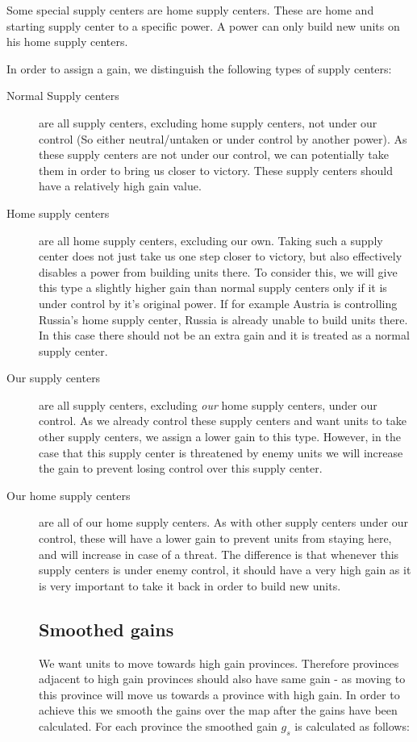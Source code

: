 \documentclass[a4paper]{article} %
\begin{document}
Some special supply centers are home supply centers. These are home and starting supply center to a specific power. A power can only build new units on his home supply centers.   

In order to assign a gain, we distinguish the following types of supply centers: 

\begin{description} 

\item[Normal Supply centers]
are all supply centers, excluding home supply centers, not under our control (So either neutral/untaken or under control by another power). As these supply centers are not under our control, we can potentially take them in order to bring us closer to victory. These supply centers should have a relatively high gain value. 

\item[Home supply centers]
are all home supply centers, excluding our own. Taking such a supply center does not just take us one step closer to victory, but also effectively disables a power from building units there. To consider this, we will give this type a slightly higher gain than normal supply centers only if it is under control by it's original power. If for example Austria is controlling Russia's home supply center, Russia is already unable to build units there. In this case there should not be an extra gain and it is treated as a normal supply center.    

\item[Our supply centers] are all supply centers, excluding \textit{our} home supply centers, under our control. As we already control these supply centers and want units to take other supply centers, we assign a lower gain to this type. However, in the case that this supply center is threatened by enemy units we will increase the gain to prevent losing control over this supply center.  

\item[Our home supply centers] are all of our home supply centers. As with other supply centers under our control, these will have a lower gain to prevent units from staying here, and will increase in case of a threat. The difference is that whenever this supply centers is under enemy control, it should have a very high gain as it is very important to take it back in order to build new units.   

\subsection{Smoothed gains}
We want units to move towards high gain provinces. Therefore provinces adjacent to high gain provinces should also have same gain - as moving to this province will move us towards a province with high gain. In order to achieve this we smooth the gains over the map after the gains have been calculated. For each province the smoothed gain $g_s$ is calculated as follows:


\end{description}
\end{document}
